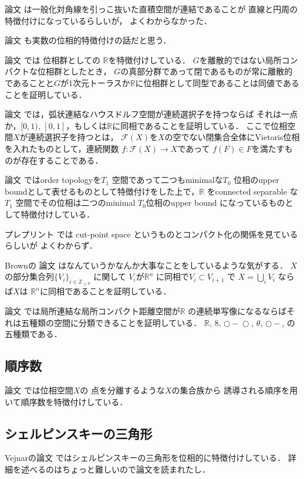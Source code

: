 \documentclass[leqno, a4paper, 12pt]{jsarticle}
\newcommand{\zz}{\mathbb{Z}}
\newcommand{\rr}{\mathbb{R}}
\begin{document}
論文
\cite{MR0257981}
は一般化対角線を引っこ抜いた直積空間が連結であることが
直線と円周の特徴付けになっているらしいが，
よくわからなかった．


論文
\cite{MR0282341}
も実数の位相的特徴付けの話だと思う．

論文
\cite{MR0866194}
では
位相群としての
$\rr$を特徴付けしている．
$G$を離散的ではない局所コンパクトな位相群としたとき，
$G$の真部分群であって閉であるものが常に離散的であることと$G$が1次元トーラスか$\rr$に位相群として同型であることは同値であることを証明している．


論文
\cite{MR1617361}
では，弧状連結なハウスドルフ空間が連続選択子を持つならば
それは一点か，$[0, 1)$, 
$[0, 1]$，もしくは$\rr$に同相であることを証明している．
ここで位相空間$X$が連続選択子を持つとは，
$\mathcal{F}(X)$を$X$の空でない閉集合全体にVietoris位相を入れたものとして，連続関数
$f\colon \mathcal{F}(X)\to X$であって
$f(F)\in F$を満たすものが存在することである．

論文
\cite{MR0283767}
ではorder topologyを$T_{1}$
空間であって二つもminimalな$T_{0}$
位相のupper boundとして表せるものとして特徴付けをした上で，$\rr$
をconnected separable な$T_{1}$
空間でその位相は二つのminimal
$T_{0}$位相のupper bound
になっているものとして特徴付けしている．



プレプリント
\cite{lipham2019compactification}
では
cut-point space
というものとコンパクト化の関係を見ているらしいが
よくわからず．

Brownの
論文
\cite{MR0126835}
はなんていうかなんか大事なことをしているような気がする．
$X$の部分集合列$\{V_{i}\}_{i\in \zz_{\ge 0}}$
に関して
$V_{i}$が$\rr^{n}$
に同相で$V_{i}\subset V_{i+1}$
で
$X=\bigcup_{i}V_{i}$
ならば$X$は
$\rr^{n}$に同相であることを証明している．


論文
\cite{MR0220251}
では局所連結な局所コンパクト距離空間が$\rr$
の連続単写像になるならばそれは五種類の空間に分類できることを証明している．
$\rr$, 
$8$, 
$\bigcirc\! \! -\! \!\bigcirc$, 
$\theta$, 
$\bigcirc\!-$, 
の五種類である．



\subsection{順序数}
論文
\cite{MR2891422}
では位相空間$X$の
点を分離するような$X$の集合族から
誘導される順序を用いて順序数を特徴付けしている．

\subsection{シェルピンスキーの三角形}
Vejnarの論文
\cite{MR2879369}
ではシェルピンスキーの三角形を位相的に特徴付けしている．
詳細を述べるのはちょっと難しいので論文を読まれたし．
\end{document}
